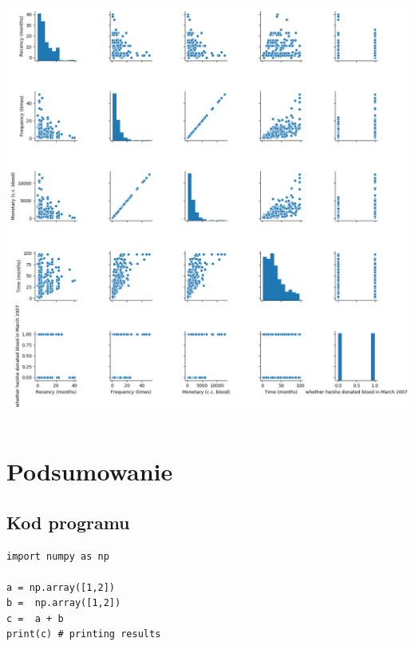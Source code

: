 \documentclass[11pt, a4paper, notitlepage]{report}
\begin{document}
\includegraphics[width=400pt,height=400pt]{graphics/correlation_2} \\ 

\chapter{Podsumowanie}
\lipsum[2]


\begin{appendices}
\chapter{Kod programu}
\begin{verbatim}
import numpy as np

a = np.array([1,2])
b =  np.array([1,2])
c =  a + b
print(c) # printing results
\end{verbatim}
\end{appendices}
\end{document}
